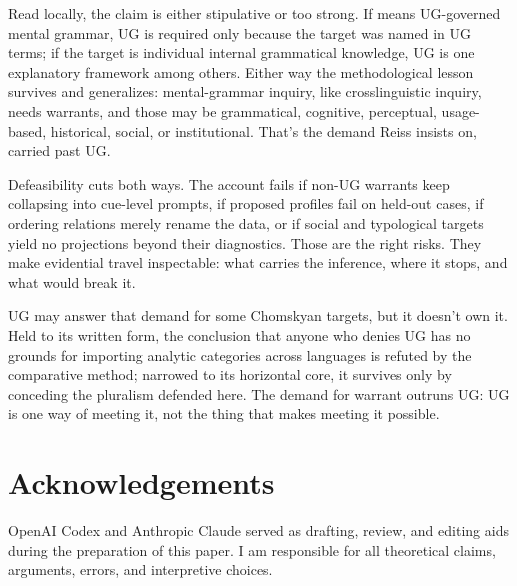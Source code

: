 \documentclass[12pt]{article}
\begin{document}
Read locally, the claim is either stipulative or too strong. If  means UG-governed mental grammar, UG is required only because the target was named in UG terms; if the target is individual internal grammatical knowledge, UG is one explanatory framework among others. Either way the methodological lesson survives and generalizes: mental-grammar inquiry, like crosslinguistic inquiry, needs warrants, and those may be grammatical, cognitive, perceptual, usage-based, historical, social, or institutional. That's the demand Reiss insists on, carried past UG.

Defeasibility cuts both ways. The account fails if non-UG warrants keep collapsing into cue-level prompts, if proposed profiles fail on held-out cases, if ordering relations merely rename the data, or if social and typological targets yield no projections beyond their diagnostics. Those are the right risks. They make evidential travel inspectable: what carries the inference, where it stops, and what would break it.

UG may answer that demand for some Chomskyan targets, but it doesn't own it. Held to its written form, the conclusion that anyone who denies UG has no grounds for importing analytic categories across languages is refuted by the comparative method; narrowed to its horizontal core, it survives only by conceding the pluralism defended here. The demand for warrant outruns UG: UG is one way of meeting it, not the thing that makes meeting it possible.

\section*{Acknowledgements}

OpenAI Codex and Anthropic Claude served as drafting, review, and editing aids during the preparation of this paper. I am responsible for all theoretical claims, arguments, errors, and interpretive choices.

\clearpage
\printbibliography
\end{document}
